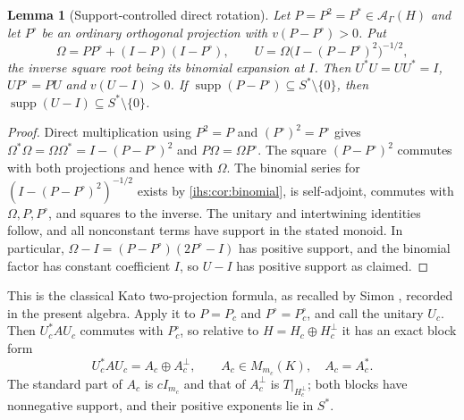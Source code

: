 \documentclass[11pt,a4paper]{article}
\numberwithin{equation}{section}
\newtheorem{lemma}[lemma]{Lemma}
\theoremstyle{definition}
\theoremstyle{remark}
\newcommand{\K}{K}
\newcommand{\Ahh}{\mathcal A_\Gamma(H)}
\newcommand{\supp}{\operatorname{supp}}
\begin{document}
\begin{lemma}[Support-controlled direct rotation]\label{ihs:fr:lem:rotation}
Let $P=P^2=P^*\in\Ahh$ and let $P^\circ$ be an ordinary orthogonal projection
with $v(P-P^\circ)>0$. Put
\begin{equation}\label{ihs:fr:eq:rotation}
 \Omega=PP^\circ+(I-P)(I-P^\circ),\qquad
 U=\Omega\bigl(I-(P-P^\circ)^2\bigr)^{-1/2},
\end{equation}
the inverse square root being its binomial expansion at $I$. Then
$U^*U=UU^*=I$, $UP^\circ=PU$ and $v(U-I)>0$. If
$\supp(P-P^\circ)\subseteq S^*\setminus\{0\}$, then
$\supp(U-I)\subseteq S^*\setminus\{0\}$.
\end{lemma}
\begin{proof}
Direct multiplication using $P^2=P$ and $(P^\circ)^2=P^\circ$ gives
$\Omega^*\Omega=\Omega\Omega^*=I-(P-P^\circ)^2$ and $P\Omega=\Omega P^\circ$.
The square $(P-P^\circ)^2$ commutes with both projections and hence with
$\Omega$. The binomial series for $(I-(P-P^\circ)^2)^{-1/2}$ exists by
\cref{ihs:cor:binomial}, is self-adjoint, commutes with $\Omega,P,P^\circ$,
and squares to the inverse. The unitary and intertwining identities follow,
and all nonconstant terms have support in the stated monoid. In particular,
$\Omega-I=(P-P^\circ)(2P^\circ-I)$ has positive support, and the binomial
factor has constant coefficient $I$, so $U-I$ has positive support as claimed.
\end{proof}

This is the classical Kato two-projection formula, as recalled by Simon
\cite[Equation~(4)]{SimonProjections},
recorded in the present algebra. Apply it to $P=P_c$ and $P^\circ=P^\circ_c$,
and call the unitary $U_c$. Then $U_c^*AU_c$ commutes with $P^\circ_c$, so
relative to $H=H_c\oplus H_c^\perp$ it has an exact block form
\begin{equation}\label{ihs:fr:eq:block}
 U_c^*AU_c=A_c\oplus A_c^\perp,\qquad A_c\in M_{m_c}(\K),\quad A_c=A_c^*.
\end{equation}
The standard part of $A_c$ is $cI_{m_c}$ and that of $A_c^\perp$ is
$T|_{H_c^\perp}$; both blocks have nonnegative support, and their positive
exponents lie in $S^*$.
\end{document}
